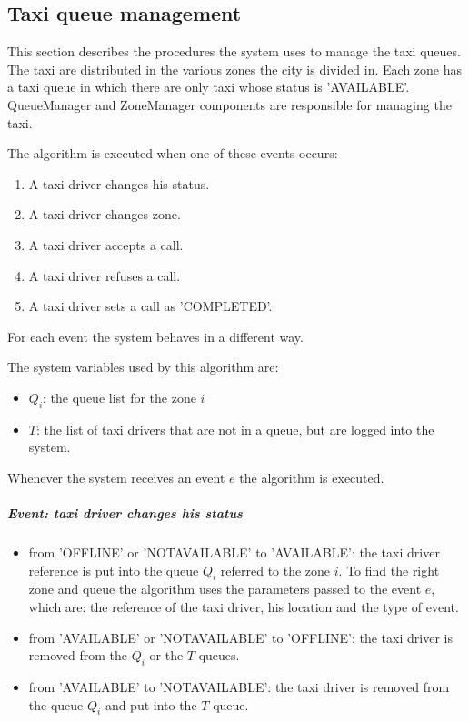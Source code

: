 \subsection{Taxi queue management}
This section describes the procedures the system uses to manage the taxi queues.
\newline
The taxi are distributed in the various zones the city is divided in. Each zone has a taxi queue in which there are only taxi whose status is 'AVAILABLE'.
QueueManager and ZoneManager components are responsible for managing the taxi.

The algorithm is executed when one of these events occurs:
\begin{enumerate}
    \item A taxi driver changes his status.
    \item A taxi driver changes zone.
    \item A taxi driver accepts a call.
    \item A taxi driver refuses a call.
    \item A taxi driver sets a call as 'COMPLETED'.
\end{enumerate}
For each event the system behaves in a different way.

The system variables used by this algorithm are:
\begin{itemize}
    \item $Q_i$: the queue list for the zone $i$
    \item $T$: the list of taxi drivers that are not in a queue, but are logged into the system.
\end{itemize}

Whenever the system receives an event $e$ the algorithm is executed.
\subparagraph{Event: taxi driver changes his status}
\begin{itemize}
    \item from 'OFFLINE' or 'NOTAVAILABLE' to 'AVAILABLE': the taxi driver reference is put into the queue $Q_i$ referred to the zone $i$. To find the right zone and queue the algorithm uses the parameters passed to the event $e$, which are: the reference of the taxi driver, his location and the type of event.
    \item from 'AVAILABLE' or 'NOTAVAILABLE' to 'OFFLINE': the taxi driver is removed from the $Q_i$ or the $T$ queues.
    \item from 'AVAILABLE' to 'NOTAVAILABLE': the taxi driver is removed from the queue $Q_i$ and put into the $T$ queue.
\end{itemize}

